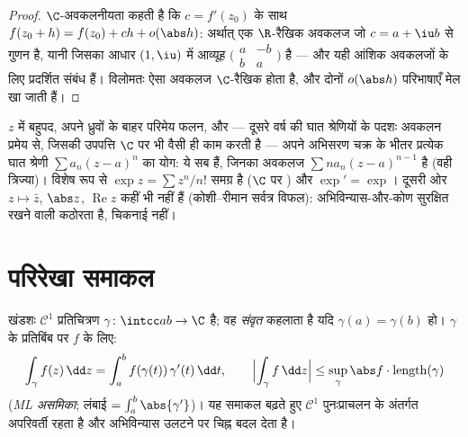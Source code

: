 \begin{proof}
$\C$-अवकलनीयता कहती है कि $c = f'(z_0)$ के साथ $f(z_0 + h) = f(z_0) + ch +
o(\abs h)$: अर्थात् एक
$\R$-रैखिक अवकलज जो $c = a + \iu b$ से गुणन है, यानी जिसका आधार $(1, \iu)$ में
आव्यूह $\bigl(\begin{smallmatrix} a & -b\\ b & a
\end{smallmatrix}\bigr)$ है --- और यही आंशिक अवकलजों के लिए प्रदर्शित संबंध
हैं। विलोमतः ऐसा अवकलज $\C$-रैखिक होता है, और दोनों $o(\abs h)$
परिभाषाएँ मेल खा जाती हैं।
\end{proof}

\begin{example}\label{ex:b3:holomorphic:examples}
$z$ में बहुपद, अपने ध्रुवों के बाहर परिमेय फलन, और --- दूसरे वर्ष
की घात श्रेणियों के पदशः अवकलन प्रमेय से, जिसकी उपपत्ति $\C$ पर
भी वैसी ही काम करती है --- अपने अभिसरण चक्र के भीतर प्रत्येक घात
श्रेणी $\sum a_n(z - a)^n$ का योग: ये सब  हैं, जिनका अवकलज $\sum na_n(z -
a)^{n-1}$ है
(वही त्रिज्या)। विशेष रूप से $\exp z = \sum z^n/n!$ समग्र है ($\C$ पर )
और $\exp' = \exp$। दूसरी ओर $z \mapsto \bar z$, $\abs z$, $\operatorname{Re}z$ कहीं भी  नहीं हैं
(कोशी--रीमान सर्वत्र विफल):  अभिविन्यास-और-कोण
सुरक्षित रखने वाली कठोरता है, चिकनाई नहीं।
\end{example}

\section{परिरेखा समाकल}

\begin{definition}\label{def:b3:holomorphic:contour}
\emph{} खंडशः $\mathcal C^1$ प्रतिचित्रण $\gamma \colon
\intcc ab \to \C$ है; वह \emph{संवृत} कहलाता
है यदि $\gamma(a) =
\gamma(b)$ हो। $\gamma$ के प्रतिबिंब पर  $f$ के
लिए:
\[
\int_\gamma f(z)\,\dd z =
\int_a^b f(\gamma(t))\,\gamma'(t)\,\dd t,
\qquad
\Bigl|\int_\gamma f\,\dd z\Bigr| \leq
\sup_{\gamma}\abs f\cdot\operatorname{length}(\gamma)
\]
(\emph{ML असमिका}; लंबाई $= \int_a^b\abs{\gamma'}$)। यह समाकल बढ़ते हुए $\mathcal C^1$
पुनःप्राचलन के अंतर्गत अपरिवर्ती रहता है और अभिविन्यास उलटने पर
चिह्न बदल देता है।
\end{definition}

